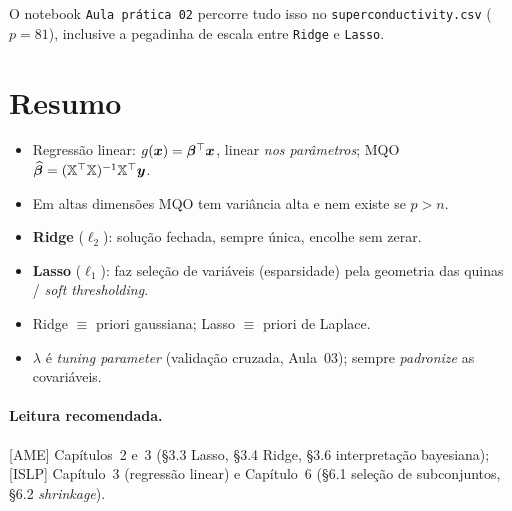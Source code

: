 \documentclass[11pt,a4paper]{article}
\begin{document}
O notebook \texttt{Aula prática 02} percorre tudo isso no
\texttt{superconductivity.csv} ($p=81$), inclusive a pegadinha de escala entre
\texttt{Ridge} e \texttt{Lasso}.

\section*{Resumo}
\begin{itemize}[leftmargin=1.4cm]
  \item Regressão linear: $g(\bm{x})=\bm{\beta}^\top\bm{x}$, linear \emph{nos parâmetros};
        MQO $\widehat{\bm{\beta}}=(\mathbb{X}^\top\mathbb{X})^{-1}\mathbb{X}^\top\bm{y}$.
  \item Em altas dimensões MQO tem variância alta e nem existe se $p>n$.
  \item \textbf{Ridge} ($\ell_2$): solução fechada, sempre única, encolhe sem
        zerar.
  \item \textbf{Lasso} ($\ell_1$): faz seleção de variáveis (esparsidade) pela
        geometria das quinas / \emph{soft thresholding}.
  \item Ridge $\equiv$ priori gaussiana; Lasso $\equiv$ priori de Laplace.
  \item $\lambda$ é \emph{tuning parameter} (validação cruzada, Aula~03); sempre
        \emph{padronize} as covariáveis.
\end{itemize}

\paragraph{Leitura recomendada.} [AME] Capítulos~2 e~3 (§3.3 Lasso, §3.4 Ridge,
§3.6 interpretação bayesiana); [ISLP] Capítulo~3 (regressão linear) e Capítulo~6
(§6.1 seleção de subconjuntos, §6.2 \emph{shrinkage}).
\end{document}

